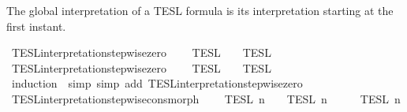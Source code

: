 \begin{isabellebody}
{\isafoldproof}%
%
\isadelimproof
%
\endisadelimproof
%
\begin{isamarkuptext}%
The global interpretation of a TESL formula is its interpretation starting
  at the first instant.%
\end{isamarkuptext}\isamarkuptrue%
\isamarkupfalse%
\ TESL{\isacharunderscore}interpretation{\isacharunderscore}stepwise{\isacharunderscore}zero{\isacharcolon}\isanewline
\ \ {\isacartoucheopen}{\isasymlbrakk}\ {\isasymphi}\ {\isasymrbrakk}\isactrlsub T\isactrlsub E\isactrlsub S\isactrlsub L\ {\isacharequal}\ {\isasymlbrakk}\ {\isasymphi}\ {\isasymrbrakk}\isactrlsub T\isactrlsub E\isactrlsub S\isactrlsub L\isactrlbsup {\isasymge}\ {}\isactrlesup {\isacartoucheclose}\isanewline
%
\isadelimproof
\isanewline
\ \ %
\endisadelimproof
%
\isatagproof
{}\isamarkupfalse%
%
\endisatagproof
{\isafoldproof}%
%
\isadelimproof
\isanewline
%
\endisadelimproof
\isanewline
{}\isamarkupfalse%
\ TESL{\isacharunderscore}interpretation{\isacharunderscore}stepwise{\isacharunderscore}zero{\isacharprime}{\isacharcolon}\isanewline
\ \ {\isacartoucheopen}{\isasymlbrakk}{\isasymlbrakk}\ {\isasymPhi}\ {\isasymrbrakk}{\isasymrbrakk}\isactrlsub T\isactrlsub E\isactrlsub S\isactrlsub L\ {\isacharequal}\ {\isasymlbrakk}{\isasymlbrakk}\ {\isasymPhi}\ {\isasymrbrakk}{\isasymrbrakk}\isactrlsub T\isactrlsub E\isactrlsub S\isactrlsub L\isactrlbsup {\isasymge}\ {}\isactrlesup {\isacartoucheclose}\isanewline
%
\isadelimproof
%
\endisadelimproof
%
\isatagproof
{}\isamarkupfalse%
\ {\isacharparenleft}induction\ {\isasymPhi}{\isacharcomma}\ simp{\isacharcomma}\ simp\ add{\isacharcolon}\ TESL{\isacharunderscore}interpretation{\isacharunderscore}stepwise{\isacharunderscore}zero{\isacharparenright}%
\endisatagproof
{\isafoldproof}%
%
\isadelimproof
\isanewline
%
\endisadelimproof
\isanewline
{}\isamarkupfalse%
\ TESL{\isacharunderscore}interpretation{\isacharunderscore}stepwise{\isacharunderscore}cons{\isacharunderscore}morph{\isacharcolon}\isanewline
\ \ {\isacartoucheopen}{\isasymlbrakk}\ {\isasymphi}\ {\isasymrbrakk}\isactrlsub T\isactrlsub E\isactrlsub S\isactrlsub L\isactrlbsup {\isasymge}\ n\isactrlesup \ {\isasyminter}\ {\isasymlbrakk}{\isasymlbrakk}\ {\isasymPhi}\ {\isasymrbrakk}{\isasymrbrakk}\isactrlsub T\isactrlsub E\isactrlsub S\isactrlsub L\isactrlbsup {\isasymge}\ n\isactrlesup \ {\isacharequal}\ {\isasymlbrakk}{\isasymlbrakk}\ {\isasymphi}\ {\isacharhash}\ {\isasymPhi}\ {\isasymrbrakk}{\isasymrbrakk}\isactrlsub T\isactrlsub E\isactrlsub S\isactrlsub L\isactrlbsup {\isasymge}\ n\isactrlesup {\isacartoucheclose}\isanewline

\end{isabellebody}
